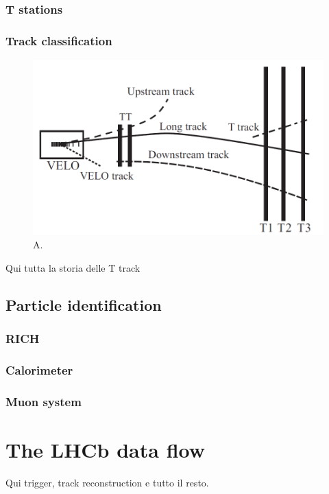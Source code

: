 \subsubsection{T stations}

\subsubsection{Track classification}

\begin{figure}[t]
	\centering
	\includegraphics[width=.8\textwidth]{graphics/02-lhcb/Track_Definitions.png}
	\caption{A.}
	\label{fig:2:track_classification}
\end{figure}

Qui tutta la storia delle T track

\subsection{Particle identification}

\subsubsection{RICH}

\subsubsection{Calorimeter}

\subsubsection{Muon system}

\section{The LHCb data flow}
Qui trigger, track reconstruction e tutto il resto.

